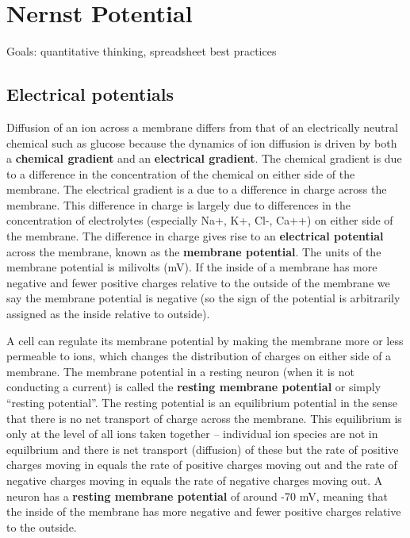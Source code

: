 \documentclass[]{book}
\begin{document}
\chapter{Nernst Potential}\label{nernst-potential}

Goals: quantitative thinking, spreadsheet best practices

\section{Electrical potentials}\label{electrical-potentials}

Diffusion of an ion across a membrane differs from that of an
electrically neutral chemical such as glucose because the dynamics of
ion diffusion is driven by both a \textbf{chemical gradient} and an
\textbf{electrical gradient}. The chemical gradient is due to a
difference in the concentration of the chemical on either side of the
membrane. The electrical gradient is a due to a difference in charge
across the membrane. This difference in charge is largely due to
differences in the concentration of electrolytes (especially Na+, K+,
Cl-, Ca++) on either side of the membrane. The difference in charge
gives rise to an \textbf{electrical potential} across the membrane,
known as the \textbf{membrane potential}. The units of the membrane
potential is milivolts (mV). If the inside of a membrane has more
negative and fewer positive charges relative to the outside of the
membrane we say the membrane potential is negative (so the sign of the
potential is arbitrarily assigned as the inside relative to outside).

A cell can regulate its membrane potential by making the membrane more
or less permeable to ions, which changes the distribution of charges on
either side of a membrane. The membrane potential in a resting neuron
(when it is not conducting a current) is called the \textbf{resting
membrane potential} or simply ``resting potential''. The resting
potential is an equilibrium potential in the sense that there is no net
transport of charge across the membrane. This equilibrium is only at the
level of all ions taken together -- individual ion species are not in
equilbrium and there is net transport (diffusion) of these but the rate
of positive charges moving in equals the rate of positive charges moving
out and the rate of negative charges moving in equals the rate of
negative charges moving out. A neuron has a \textbf{resting membrane
potential} of around -70 mV, meaning that the inside of the membrane has
more negative and fewer positive charges relative to the outside.
\end{document}
